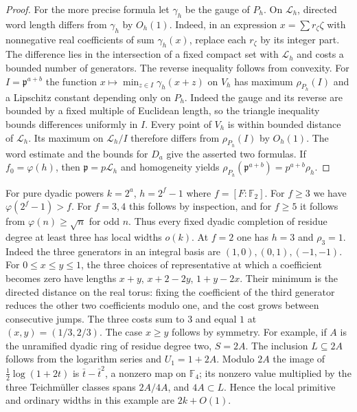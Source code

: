 \documentclass[11pt,letterpaper]{article}
\theoremstyle{definition}
\numberwithin{equation}{section}
\begin{document}
\begin{proof}
For the more precise formula let $\gamma_h$ be the gauge of $P_h$.
On $\mathcal L_h$, directed word length differs from $\gamma_h$ by
$O_h(1)$. Indeed, in an expression $x=\sum r_\zeta\zeta$ with
nonnegative real coefficients of sum $\gamma_h(x)$, replace each
$r_\zeta$ by its integer part. The difference lies in the intersection
of a fixed compact set with $\mathcal L_h$ and costs a bounded
number of generators. The reverse inequality follows from convexity.
For $I=\mathfrak p^{a+b}$ the function
$x\mapsto\min_{z\in I}\gamma_h(x+z)$ on $V_h$ has maximum
$\rho_{P_h}(I)$ and a Lipschitz constant depending only on $P_h$.
Indeed the gauge and its reverse are bounded by a fixed multiple of
Euclidean length, so the triangle inequality bounds differences
uniformly in $I$. Every point of $V_h$ is within bounded distance
of $\mathcal L_h$. Its maximum on $\mathcal L_h/I$ therefore differs
from $\rho_{P_h}(I)$ by $O_h(1)$. The word estimate and the bounds
for $D_a$ give the asserted two formulas. If $f_0=\varphi(h)$, then
$\mathfrak p=p\mathcal L_h$ and homogeneity yields
$\rho_{P_h}(\mathfrak p^{a+b})=p^{a+b}\rho_h$.
\end{proof}

For pure dyadic powers $k=2^a$, $h=2^f-1$ where $f=[F:\mathbb F_2]$.
For $f\ge3$ we have $\varphi(2^f-1)>f$. For $f=3,4$ this follows
by inspection, and for $f\ge5$ it follows from $\varphi(n)\ge\sqrt n$
for odd $n$. Thus every fixed dyadic completion of residue degree at
least three has local widths $o(k)$. At $f=2$ one has $h=3$ and
$\rho_3=1$. Indeed the three generators in an integral basis are
$(1,0),(0,1),(-1,-1)$. For $0\le x\le y\le1$, the three choices of
representative at which a coefficient becomes zero have lengths
$x+y$, $x+2-2y$, $1+y-2x$. Their minimum is the directed distance on
the real torus: fixing the coefficient of the third generator reduces
the other two coefficients modulo one, and the cost grows between
consecutive jumps. The three costs sum to $3$ and equal $1$ at
$(x,y)=(1/3,2/3)$. The case $x\ge y$ follows by symmetry.
For example, if $A$ is the unramified dyadic ring of residue degree
two, $S=2A$. The inclusion $L\subseteq 2A$ follows from the logarithm
series and $U_1=1+2A$. Modulo $2A$ the image of
$\frac12\log(1+2t)$ is $\bar t-\bar t^2$, a nonzero map on $\mathbb F_4$;
its nonzero value multiplied by the three Teichm\"uller classes spans
$2A/4A$, and $4A\subset L$. Hence the local primitive and ordinary
widths in this example are $2k+O(1)$.
\end{document}

